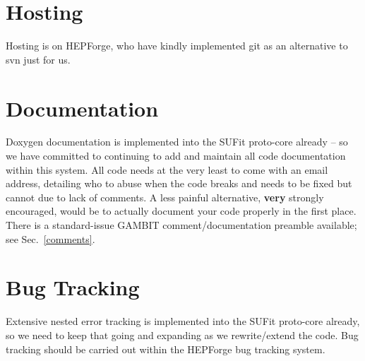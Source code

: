 \section{Hosting}

Hosting is on HEPForge, who have kindly implemented git as an alternative to svn just for us.

\section{Documentation}

Doxygen documentation is implemented into the SUFit proto-core already -- so we have committed to continuing to add and maintain all code documentation within this system.  All code needs at the very least to come with an email address, detailing who to abuse when the code breaks and needs to be fixed but cannot due to lack of comments.  A less painful alternative, \textbf{very} strongly encouraged, would be to actually document your code properly in the first place.  There is a standard-issue GAMBIT comment/documentation preamble available; see Sec.~\ref{comments}.

\section{Bug Tracking}

Extensive nested error tracking is implemented into the SUFit proto-core already, so we need to keep that going and expanding as we rewrite/extend the code.  Bug tracking should be carried out within the HEPForge bug tracking system.


